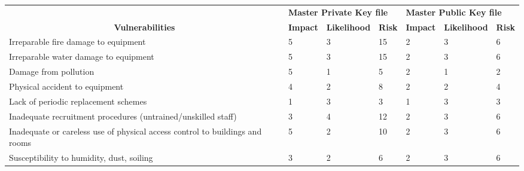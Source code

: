 \begin{table}[]
  \label{tab:example_vulns_risks}
  \begin{tabularx}{\linewidth}{Xllllll}
    \rowcolor[HTML]{9BC1E6}
    \multicolumn{1}{c}{\cellcolor[HTML]{8497B0}} & \multicolumn{3}{l}{\cellcolor[HTML]{9BC1E6}\textbf{Master Private Key file}} & \multicolumn{3}{l}{\cellcolor[HTML]{9BC1E6}\textbf{Master Public Key file}} \\
    \multicolumn{1}{c}{\multirow{-2}{*}{\cellcolor[HTML]{8497B0}\textbf{Vulnerabilities}}} & \cellcolor[HTML]{D87B79}\textbf{Impact} & \cellcolor[HTML]{C6E0B4}\textbf{Likelihood} & \cellcolor[HTML]{8EA9DB}\textbf{Risk} & \cellcolor[HTML]{D87B79}\textbf{Impact} & \cellcolor[HTML]{C6E0B4}\textbf{Likelihood} & \cellcolor[HTML]{8EA9DB}\textbf{Risk} \\
    \cellcolor[HTML]{A9D08E}Irreparable fire damage to equipment & 5 & 3 & \cellcolor[HTML]{FDBB7B}15 & 2 & 3 & \cellcolor[HTML]{A3C37C}6 \\
    \rowcolor[HTML]{EFEFEF}
    \cellcolor[HTML]{A9D08E}Irreparable water damage to equipment & 5 & 3 & \cellcolor[HTML]{FDBB7B}15 & 2 & 3 & \cellcolor[HTML]{A3C37C}6 \\
    \cellcolor[HTML]{A9D08E}Damage from pollution & 5 & 1 & \cellcolor[HTML]{96C27C}5 & 2 & 1 & \cellcolor[HTML]{6FBF7B}2 \\
    \rowcolor[HTML]{EFEFEF}
    \cellcolor[HTML]{A9D08E}Physical accident to equipment & 4 & 2 & \cellcolor[HTML]{BCC57C}8 & 2 & 2 & \cellcolor[HTML]{88C17B}4 \\
    \cellcolor[HTML]{A9D08E}Lack of periodic replacement schemes & 1 & 3 & \cellcolor[HTML]{7CC07B}3 & 1 & 3 & \cellcolor[HTML]{7CC07B}3 \\
    \rowcolor[HTML]{EFEFEF}
    \cellcolor[HTML]{A9D08E}Inadequate recruitment procedures (untrained/unskilled staff) & 3 & 4 & \cellcolor[HTML]{F0C97D}12 & 2 & 3 & \cellcolor[HTML]{A3C37C}6 \\
    \cellcolor[HTML]{A9D08E}Inadequate or careless use of physical access control to buildings and rooms & 5 & 2 & \cellcolor[HTML]{D6C77D}10 & 2 & 3 & \cellcolor[HTML]{A3C37C}6 \\
    \rowcolor[HTML]{EFEFEF}
    \cellcolor[HTML]{A9D08E}Susceptibility to humidity, dust, soiling & 3 & 2 & \cellcolor[HTML]{A3C37C}6 & 2 & 3 & \cellcolor[HTML]{A3C37C}6
  \end{tabularx}
\end{table}
